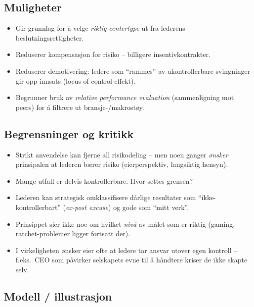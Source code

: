 \subsection*{Muligheter}
\begin{itemize}
\item Gir grunnlag for å velge \emph{riktig centertype} ut fra lederens beslutningsrettigheter.
\item Reduserer kompensasjon for risiko -- billigere insentivkontrakter.
\item Reduserer demotivering: ledere som ``rammes'' av ukontrollerbare svingninger gir opp innsats (locus of control-effekt).
\item Begrunner bruk av \emph{relative performance evaluation} (sammenligning mot peers) for å filtrere ut bransje-/makrostøy.
\end{itemize}

\subsection*{Begrensninger og kritikk}
\begin{itemize}
\item Strikt anvendelse kan fjerne all risikodeling -- men noen ganger \emph{ønsker} prinsipalen at lederen bærer risiko (eierperspektiv, langsiktig hensyn).
\item Mange utfall er delvis kontrollerbare. Hvor settes grensen?
\item Lederen kan strategisk omklassifisere dårlige resultater som ``ikke-kontrollerbart'' (\emph{ex-post excuse}) og gode som ``mitt verk''.
\item Prinsippet sier ikke noe om hvilket \emph{nivå} av målet som er riktig (gaming, ratchet-problemer ligger fortsatt der).
\item I virkeligheten ønsker eier ofte at ledere tar ansvar utover egen kontroll -- f.eks.\ CEO som påvirker selskapets evne til å håndtere kriser de ikke skapte selv.
\end{itemize}

\subsection*{Modell / illustrasjon}

